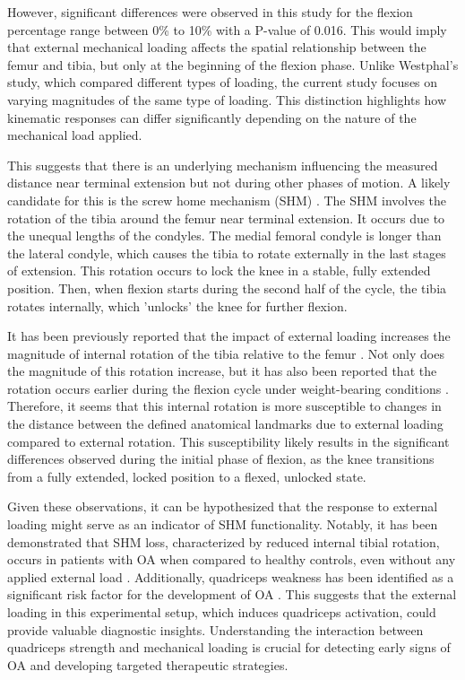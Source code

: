 \documentclass{micro-econ-thesis}
\begin{document}
However, significant differences were observed in this study for the flexion percentage range between 0\% to 10\% with a P-value of 0.016. This would imply that external mechanical loading affects the spatial relationship between the femur and tibia, but only at the beginning of the flexion phase.  Unlike Westphal's study, which compared different types of loading, the current study focuses on varying magnitudes of the same type of loading. This distinction highlights how kinematic responses can differ significantly depending on the nature of the mechanical load applied.

This suggests that there is an underlying mechanism influencing the measured distance near terminal extension but not during other phases of motion. A likely candidate for this is the screw home mechanism (SHM) \parencite{kim_screw-home_2015}. The SHM involves the rotation of the tibia around the femur near terminal extension. It occurs due to the unequal lengths of the condyles. The medial femoral condyle is longer than the lateral condyle, which causes the tibia to rotate externally in the last stages of extension.   This rotation occurs to lock the knee in a stable, fully extended position. Then, when flexion starts during the second half of the cycle, the tibia rotates internally, which 'unlocks' the knee for further flexion.

It has been previously reported that the impact of external loading increases the magnitude of internal rotation of the tibia relative to the femur \parencite{myers_vivo_2012}. Not only does the magnitude of this rotation increase, but it has also been reported that the rotation occurs earlier during the flexion cycle under weight-bearing conditions \parencite{johal_tibio-femoral_2005}. Therefore, it seems that this internal rotation is more susceptible to changes in the distance between the defined anatomical landmarks due to external loading compared to external rotation. This susceptibility likely results in the significant differences observed during the initial phase of flexion, as the knee transitions from a fully extended, locked position to a flexed, unlocked state.  

Given these observations, it can be hypothesized that the response to external loading might serve as an indicator of SHM functionality. Notably, it has been demonstrated that SHM loss, characterized by reduced internal tibial rotation, occurs in patients with OA when compared to healthy controls, even without any applied external load \parencite{jeon_alteration_2020}. Additionally, quadriceps weakness has been identified as a significant risk factor for the development of OA \parencite{segal_is_2011}. This suggests that the external loading in this experimental setup, which induces quadriceps activation, could provide valuable diagnostic insights. Understanding the interaction between quadriceps strength and mechanical loading is crucial for detecting early signs of OA and developing targeted therapeutic strategies.
\end{document}
